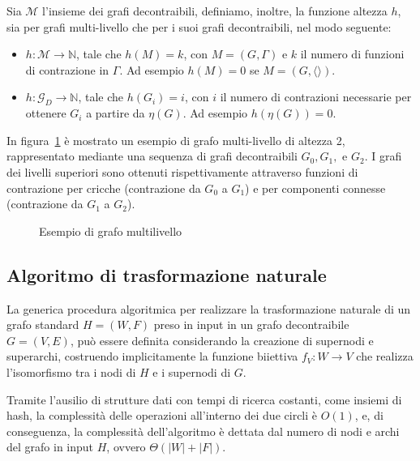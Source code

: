     Sia $\mathcal{M}$ l'insieme dei grafi decontraibili, definiamo, inoltre, la funzione altezza $h$, sia
    per grafi multi-livello che per i suoi grafi decontraibili, nel modo seguente:

    \begin{itemize}
        \item $h : \mathcal{M} \rightarrow \mathbb{N}$, tale che $h(M) = k$, con $M = (G, \Gamma)$ e $k$ il numero di
        funzioni di contrazione in $\Gamma$. Ad esempio $h(M) = 0$ se $M = (G, \langle \rangle)$.
        \item $h : \mathcal{G}_D \rightarrow \mathbb{N}$, tale che $h(G_i) = i$, con $i$ il numero di contrazioni
        necessarie per ottenere $G_i$ a partire da $\eta(G)$. Ad esempio $h(\eta(G)) = 0$.
    \end{itemize}

    In figura~\ref{fig:multi-level-graph-example} \`e mostrato un esempio di grafo multi-livello di altezza 2,
    rappresentato mediante una sequenza di grafi decontraibili $G_0, G_1,$ e $G_2$. I grafi dei livelli superiori
    sono ottenuti rispettivamente attraverso funzioni di contrazione per cricche (contrazione da $G_0$ a $G_1$) e
    per componenti connesse (contrazione da $G_1$ a $G_2$).

    \begin{figure}
        
        \caption{Esempio di grafo multilivello}
        \label{fig:multi-level-graph-example}
    \end{figure}

    \newpage

    \subsection{Algoritmo di trasformazione naturale}\label{subsec:algoritmo-di-trasformazione-naturale}

    La generica procedura algoritmica per realizzare la trasformazione naturale di un grafo standard $H = (W, F)$
    preso in input in un grafo decontraibile $G = (V, E)$, può essere definita considerando la creazione di supernodi
    e superarchi, costruendo implicitamente la funzione biiettiva $f_V: W \rightarrow V$ che realizza l'isomorfismo tra i nodi
    di $H$ e i supernodi di $G$.

    

    Tramite l'ausilio di strutture dati con tempi di ricerca costanti, come insiemi di hash, la complessit\`a delle
    operazioni all'interno dei due circli \`e $O(1)$,
    e, di conseguenza, la complessit\`a dell'algoritmo \`e dettata dal numero di nodi e archi del grafo in input $H$,
    ovvero $\Theta(|W| + |F|)$.






